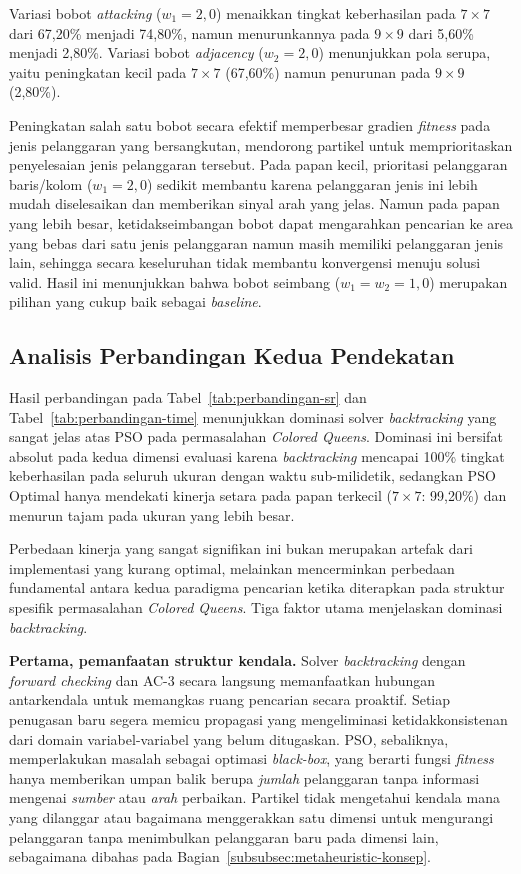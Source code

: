 Variasi bobot \textit{attacking} ($w_1 = 2{,}0$) menaikkan tingkat keberhasilan pada $7 \times 7$ dari 67,20\% menjadi 74,80\%, namun menurunkannya pada $9 \times 9$ dari 5,60\% menjadi 2,80\%. Variasi bobot \textit{adjacency} ($w_2 = 2{,}0$) menunjukkan pola serupa, yaitu peningkatan kecil pada $7 \times 7$ (67,60\%) namun penurunan pada $9 \times 9$ (2,80\%).

Peningkatan salah satu bobot secara efektif memperbesar gradien \textit{fitness} pada jenis pelanggaran yang bersangkutan, mendorong partikel untuk memprioritaskan penyelesaian jenis pelanggaran tersebut. Pada papan kecil, prioritasi pelanggaran baris/kolom ($w_1 = 2{,}0$) sedikit membantu karena pelanggaran jenis ini lebih mudah diselesaikan dan memberikan sinyal arah yang jelas. Namun pada papan yang lebih besar, ketidakseimbangan bobot dapat mengarahkan pencarian ke area yang bebas dari satu jenis pelanggaran namun masih memiliki pelanggaran jenis lain, sehingga secara keseluruhan tidak membantu konvergensi menuju solusi valid. Hasil ini menunjukkan bahwa bobot seimbang ($w_1 = w_2 = 1{,}0$) merupakan pilihan yang cukup baik sebagai \textit{baseline}.


\subsection{Analisis Perbandingan Kedua Pendekatan}
\label{subsec:analisis-perbandingan}

Hasil perbandingan pada Tabel~\ref{tab:perbandingan-sr} dan Tabel~\ref{tab:perbandingan-time} menunjukkan dominasi solver \textit{backtracking} yang sangat jelas atas PSO pada permasalahan \textit{Colored Queens}. Dominasi ini bersifat absolut pada kedua dimensi evaluasi karena \textit{backtracking} mencapai 100\% tingkat keberhasilan pada seluruh ukuran dengan waktu sub-milidetik, sedangkan PSO Optimal hanya mendekati kinerja setara pada papan terkecil ($7 \times 7$: 99,20\%) dan menurun tajam pada ukuran yang lebih besar.

Perbedaan kinerja yang sangat signifikan ini bukan merupakan artefak dari implementasi yang kurang optimal, melainkan mencerminkan perbedaan fundamental antara kedua paradigma pencarian ketika diterapkan pada struktur spesifik permasalahan \textit{Colored Queens}. Tiga faktor utama menjelaskan dominasi \textit{backtracking}.

\textbf{Pertama, pemanfaatan struktur kendala.} Solver \textit{backtracking} dengan \textit{forward checking} dan AC-3 secara langsung memanfaatkan hubungan antarkendala untuk memangkas ruang pencarian secara proaktif. Setiap penugasan baru segera memicu propagasi yang mengeliminasi ketidakkonsistenan dari domain variabel-variabel yang belum ditugaskan. PSO, sebaliknya, memperlakukan masalah sebagai optimasi \textit{black-box}, yang berarti fungsi \textit{fitness} hanya memberikan umpan balik berupa \textit{jumlah} pelanggaran tanpa informasi mengenai \textit{sumber} atau \textit{arah} perbaikan. Partikel tidak mengetahui kendala mana yang dilanggar atau bagaimana menggerakkan satu dimensi untuk mengurangi pelanggaran tanpa menimbulkan pelanggaran baru pada dimensi lain, sebagaimana dibahas pada Bagian~\ref{subsubsec:metaheuristic-konsep}.

